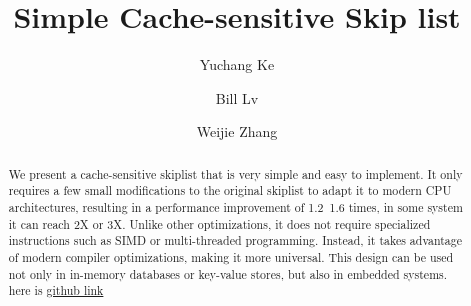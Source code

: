 \documentclass[sigconf, nonacm, letterpaper,top=2cm,bottom=2cm,left=3cm,right=3cm,marginparwidth=1.75cm]{acmart}
\begin{document}
\title{Simple Cache-sensitive Skip list}

\author{Yuchang Ke}

\author{Bill Lv}

\author{Weijie Zhang}

\begin{abstract}
      We present a cache-sensitive skiplist that is very simple and easy to implement. It only requires a few small modifications to the original skiplist to adapt it to modern CPU architectures, resulting in a performance improvement of 1.2~1.6 times, in some system it can reach 2X or 3X.
      Unlike other optimizations, it does not require specialized instructions such as SIMD or multi-threaded programming. Instead, it takes advantage of modern compiler optimizations, making it more universal. This design can be used not only in in-memory databases or key-value stores, but also in embedded systems.  here is \href{https://github.com/acekingke/simpleCacheSentiveSkiplist}{github link}

\end{abstract}

\maketitle
\end{document}
